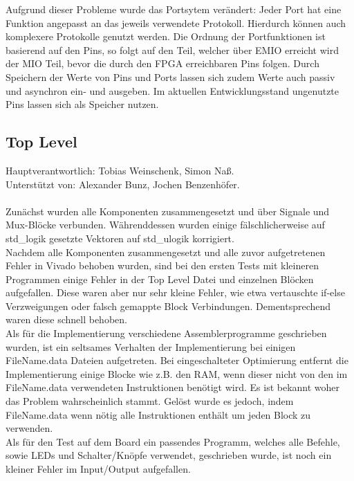 \documentclass[bibliography=totoc,listof=totoc,index=totoc]{scrartcl}
\begin{document}
Aufgrund dieser Probleme wurde das Portsytem verändert: Jeder Port hat eine Funktion angepasst an das jeweils verwendete Protokoll. Hierdurch können auch komplexere Protokolle genutzt werden. Die Ordnung der Portfunktionen ist basierend auf den Pins, so folgt auf den Teil, welcher über EMIO erreicht wird der MIO Teil, bevor die durch den FPGA erreichbaren Pins folgen. Durch Speichern der Werte von Pins und Ports lassen sich zudem Werte auch passiv und asynchron ein- und ausgeben. Im aktuellen Entwicklungsstand ungenutzte Pins lassen sich als Speicher nutzen.
\subsection{Top Level}
Hauptverantwortlich: Tobias Weinschenk, Simon Naß. \\
Unterstützt von: Alexander Bunz, Jochen Benzenhöfer.\\\\
Zunächst wurden alle Komponenten zusammengesetzt und über Signale und Mux-Blöcke verbunden. Währenddessen wurden einige fälschlicherweise auf  std\_logik gesetzte Vektoren auf std\_ulogik korrigiert. \\
Nachdem alle Komponenten zusammengesetzt und alle zuvor aufgetretenen Fehler in Vivado
behoben wurden,
sind bei den ersten Tests mit kleineren Programmen einige Fehler in der Top Level Datei und einzelnen Blöcken aufgefallen. Diese waren aber nur sehr kleine Fehler, wie etwa vertauschte if-else Verzweigungen
oder falsch gemappte Block Verbindungen. Dementsprechend waren diese schnell behoben. \\ 
Als für die Implementierung verschiedene Assemblerprogramme geschrieben wurden, ist ein seltsames Verhalten der Implementierung bei einigen FileName.data Dateien aufgetreten. Bei eingeschalteter Optimierung entfernt die Implementierung einige Blocke wie z.B. den RAM, wenn dieser nicht von den im FileName.data verwendeten Instruktionen benötigt wird. Es ist bekannt woher das Problem wahrscheinlich stammt. Gelöst wurde es jedoch, indem FileName.data wenn nötig alle Instruktionen enthält um jeden Block zu verwenden. \\
Als für den Test
auf dem Board ein passendes Programm, welches alle Befehle, sowie LEDs und Schalter/Knöpfe verwendet,
geschrieben wurde, ist noch ein kleiner Fehler im Input/Output aufgefallen.
\end{document}
